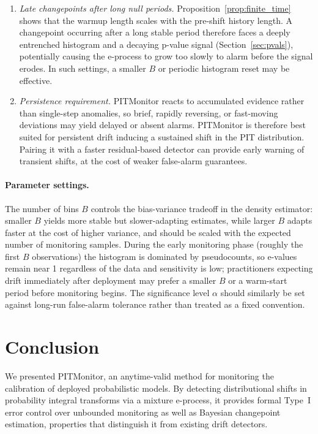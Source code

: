 \documentclass[ejsv2, noshowframe]{imsart}
\theoremstyle{plain}
\theoremstyle{definition}
\theoremstyle{remark}
\begin{document}
\begin{enumerate}
 \item \textit{Late changepoints after long null periods.} Proposition~\ref{prop:finite_time} shows that the warmup length scales with the pre-shift history length. A changepoint occurring after a long stable period therefore faces a deeply entrenched histogram and a decaying p-value signal (Section~\ref{sec:pvals}), potentially causing the e-process to grow too slowly to alarm before the signal erodes. In such settings, a smaller $B$ or periodic histogram reset may be effective.

 \item \textit{Persistence requirement.} PITMonitor reacts to accumulated evidence rather than single-step anomalies, so brief, rapidly reversing, or fast-moving deviations may yield delayed or absent alarms. PITMonitor is therefore best suited for persistent drift inducing a sustained shift in the PIT distribution. Pairing it with a faster residual-based detector can provide early warning of transient shifts, at the cost of weaker false-alarm guarantees.
\end{enumerate}


\paragraph{Parameter settings.}
The number of bins $B$ controls the bias-variance tradeoff in the density estimator: smaller $B$ yields more stable but slower-adapting estimates, while larger $B$ adapts faster at the cost of higher variance, and should be scaled with the expected number of monitoring samples. During the early monitoring phase (roughly the first $B$ observations) the histogram is dominated by pseudocounts, so e-values remain near 1 regardless of the data and sensitivity is low; practitioners expecting drift immediately after deployment may prefer a smaller $B$ or a warm-start period before monitoring begins. The significance level $\alpha$ should similarly be set against long-run false-alarm tolerance rather than treated as a fixed convention.

\section{Conclusion}
\label{sec:conclusion}
We presented PITMonitor, an anytime-valid method for monitoring the calibration of deployed probabilistic models. By detecting distributional shifts in probability integral transforms via a mixture e-process, it provides formal Type~I error control over unbounded monitoring as well as Bayesian changepoint estimation, properties that distinguish it from existing drift detectors.
\end{document}
